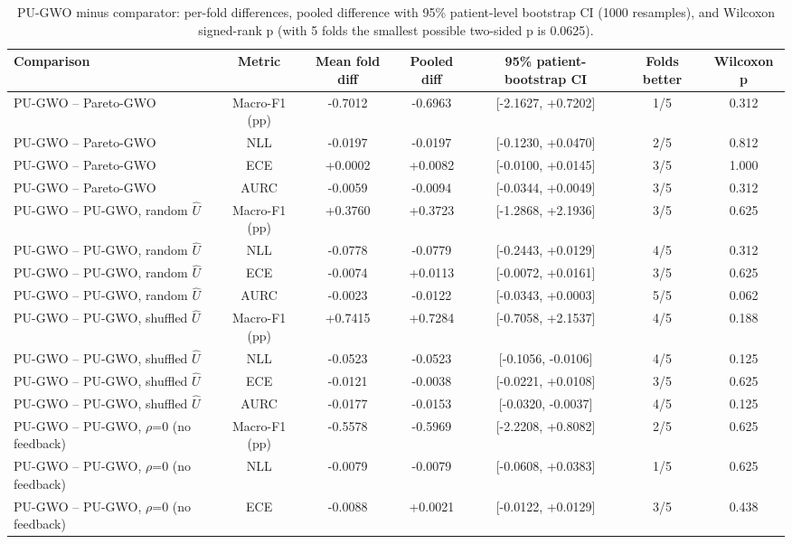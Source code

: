 \begin{table}[t]
\centering
\caption{PU-GWO minus comparator: per-fold differences, pooled difference with 95\% patient-level bootstrap CI (1000 resamples), and Wilcoxon signed-rank p (with 5 folds the smallest possible two-sided p is 0.0625).}
\label{tab:table11_paired_statistics}
\small
\begin{tabular}{lcccccc}
\toprule
Comparison & Metric & Mean fold diff & Pooled diff & 95\% patient-bootstrap CI & Folds better & Wilcoxon p \\
\midrule
PU-GWO -- Pareto-GWO & Macro-F1 (pp) & -0.7012 & -0.6963 & [-2.1627, +0.7202] & 1/5 & 0.312 \\
PU-GWO -- Pareto-GWO & NLL & -0.0197 & -0.0197 & [-0.1230, +0.0470] & 2/5 & 0.812 \\
PU-GWO -- Pareto-GWO & ECE & +0.0002 & +0.0082 & [-0.0100, +0.0145] & 3/5 & 1.000 \\
PU-GWO -- Pareto-GWO & AURC & -0.0059 & -0.0094 & [-0.0344, +0.0049] & 3/5 & 0.312 \\
PU-GWO -- PU-GWO, random $\hat{U}$ & Macro-F1 (pp) & +0.3760 & +0.3723 & [-1.2868, +2.1936] & 3/5 & 0.625 \\
PU-GWO -- PU-GWO, random $\hat{U}$ & NLL & -0.0778 & -0.0779 & [-0.2443, +0.0129] & 4/5 & 0.312 \\
PU-GWO -- PU-GWO, random $\hat{U}$ & ECE & -0.0074 & +0.0113 & [-0.0072, +0.0161] & 3/5 & 0.625 \\
PU-GWO -- PU-GWO, random $\hat{U}$ & AURC & -0.0023 & -0.0122 & [-0.0343, +0.0003] & 5/5 & 0.062 \\
PU-GWO -- PU-GWO, shuffled $\hat{U}$ & Macro-F1 (pp) & +0.7415 & +0.7284 & [-0.7058, +2.1537] & 4/5 & 0.188 \\
PU-GWO -- PU-GWO, shuffled $\hat{U}$ & NLL & -0.0523 & -0.0523 & [-0.1056, -0.0106] & 4/5 & 0.125 \\
PU-GWO -- PU-GWO, shuffled $\hat{U}$ & ECE & -0.0121 & -0.0038 & [-0.0221, +0.0108] & 3/5 & 0.625 \\
PU-GWO -- PU-GWO, shuffled $\hat{U}$ & AURC & -0.0177 & -0.0153 & [-0.0320, -0.0037] & 4/5 & 0.125 \\
PU-GWO -- PU-GWO, $\rho$=0 (no feedback) & Macro-F1 (pp) & -0.5578 & -0.5969 & [-2.2208, +0.8082] & 2/5 & 0.625 \\
PU-GWO -- PU-GWO, $\rho$=0 (no feedback) & NLL & -0.0079 & -0.0079 & [-0.0608, +0.0383] & 1/5 & 0.625 \\
PU-GWO -- PU-GWO, $\rho$=0 (no feedback) & ECE & -0.0088 & +0.0021 & [-0.0122, +0.0129] & 3/5 & 0.438 \\

\end{tabular}
\end{table}
